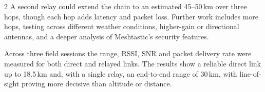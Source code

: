 \documentclass[a0,portrait]{hogent-poster}
\begin{document}
\begin{multicols}{2}
A second relay could extend the chain to an estimated 45--50\,km over three hops, though each hop adds latency and packet loss.
Further work includes more hops, testing across different weather conditions, higher-gain or directional antennas, and a deeper analysis of Meshtastic's security features.

Across three field sessions the range, RSSI, SNR and packet delivery rate were measured for both direct and relayed links. The results show a reliable direct link up to 18.5\,km and, with a single relay, an end-to-end range of 30\,km, with line-of-sight proving more decisive than altitude or distance.

\end{multicols}
\end{document}
